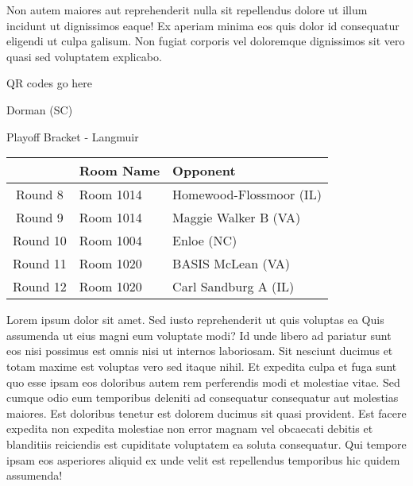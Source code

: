 \documentclass{article}%
\begin{document}
\newline%
Non autem maiores aut reprehenderit nulla sit repellendus dolore ut illum incidunt ut dignissimos eaque! Ex aperiam minima eos quis dolor id consequatur eligendi ut culpa galisum. Non fugiat corporis vel doloremque dignissimos sit vero quasi sed voluptatem explicabo.\newline%
\newline%
%
\vspace*{30pt}%
\begin{center}%
\begin{Huge}%
QR codes go here%
\end{Huge}%
\end{center}%
\newpage%
\begin{center}%
\begin{Huge}%
Dorman (SC)%
\end{Huge}%
\vspace*{8pt}%
\linebreak%
\begin{Large}%
Playoff Bracket {-} Langmuir%
\end{Large}%
\end{center}%
\begin{tabularx}{\textwidth}{|c|Y|Y|}%
\hline%
&Room Name&Opponent\\%
\hline%
Round 8&Room 1014&Homewood{-}Flossmoor (IL)\\%
Round 9&Room 1014&Maggie Walker B (VA)\\%
Round 10&Room 1004&Enloe (NC)\\%
Round 11&Room 1020&BASIS McLean (VA)\\%
Round 12&Room 1020&Carl Sandburg A (IL)\\%
\hline%
\end{tabularx}%
\vspace*{8pt}%
\linebreak%
\newline%
\newline%
Lorem ipsum dolor sit amet. Sed iusto reprehenderit ut quis voluptas ea Quis assumenda ut eius magni eum voluptate modi? Id unde libero ad pariatur sunt eos nisi possimus est omnis nisi ut internos laboriosam. Sit nesciunt ducimus et totam maxime est voluptas vero sed itaque nihil. Et expedita culpa et fuga sunt quo esse ipsam eos doloribus autem rem perferendis modi et molestiae vitae.\newline%
\newline%
Sed cumque odio eum temporibus deleniti ad consequatur consequatur aut molestias maiores. Est doloribus tenetur est dolorem ducimus sit quasi provident. Est facere expedita non expedita molestiae non error magnam vel obcaecati debitis et blanditiis reiciendis est cupiditate voluptatem ea soluta consequatur. Qui tempore ipsam eos asperiores aliquid ex unde velit est repellendus temporibus hic quidem assumenda!\newline%
\end{document}
